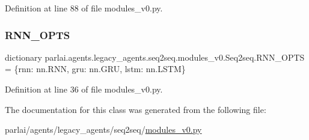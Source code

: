 Definition at line 88 of file modules\+\_\+v0.\+py.

\mbox{\label{classparlai_1_1agents_1_1legacy__agents_1_1seq2seq_1_1modules__v0_1_1Seq2seq_af1a1661b40d32cbcfcf82f951fc46d16}} 
\subsubsection{\texorpdfstring{R\+N\+N\+\_\+\+O\+P\+TS}{RNN\_OPTS}}
{\footnotesize\ttfamily dictionary parlai.\+agents.\+legacy\+\_\+agents.\+seq2seq.\+modules\+\_\+v0.\+Seq2seq.\+R\+N\+N\+\_\+\+O\+P\+TS = \{\textquotesingle{}rnn\textquotesingle{}\+: nn.\+R\+NN, \textquotesingle{}gru\textquotesingle{}\+: nn.\+G\+RU, \textquotesingle{}lstm\textquotesingle{}\+: nn.\+L\+S\+TM\}\hspace{0.3cm}{\ttfamily [static]}}



Definition at line 36 of file modules\+\_\+v0.\+py.



The documentation for this class was generated from the following file\+:\begin{DoxyCompactItemize}
\item 
parlai/agents/legacy\+\_\+agents/seq2seq/\hyperlink{seq2seq_2modules__v0_8py}{modules\+\_\+v0.\+py}\end{DoxyCompactItemize}
